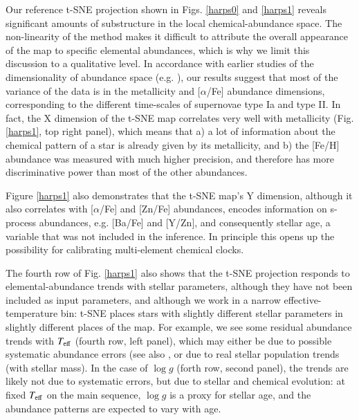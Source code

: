 \documentclass{aa}  %
\begin{document}
Our reference t-SNE projection shown in Figs. \ref{harps0} and \ref{harps1} reveals significant amounts of substructure in the local chemical-abundance space. The non-linearity of the method makes it difficult to attribute the overall appearance of the map to specific elemental abundances, which is why we limit this discussion to a qualitative level. In accordance with earlier studies of the dimensionality of abundance space (e.g. \citealt{Ting2012, Boesso2018}), our results suggest that most of the variance of the data is in the metallicity and [$\alpha$/Fe] abundance dimensions, corresponding to the different time-scales of supernovae type Ia and type II. In fact, the X dimension of the t-SNE map correlates very well with metallicity (Fig. \ref{harps1}, top right panel), which means that a) a lot of information about the chemical pattern of a star is already given by its metallicity, and b) the [Fe/H] abundance was measured with much higher precision, and therefore has more discriminative power than most of the other abundances. 

Figure \ref{harps1} also demonstrates that the t-SNE map's Y dimension, although it also correlates with [$\alpha$/Fe] and [Zn/Fe] abundances, encodes information on s-process abundances, e.g. [Ba/Fe] and [Y/Zn], and consequently stellar age, a variable that was not included in the inference. In principle this opens up the possibility for calibrating multi-element chemical clocks.%

The fourth row of Fig. \ref{harps1} also shows that the t-SNE projection responds to elemental-abundance trends with stellar parameters, although they have not been included as input parameters, and although we work in a narrow effective-temperature bin: t-SNE places stars with slightly different stellar parameters in slightly different places of the map. For example, we see some residual abundance trends with $T_{\rm eff}$ (fourth row, left panel), which may either be due to possible systematic abundance errors (see also \citealt{DelgadoMena2017}, or due to real stellar population trends (with stellar mass). In the case of $\log g$ (forth row, second panel), the trends are likely not due to systematic errors, but due to stellar and chemical evolution: at fixed $T_{\rm eff}$ on the main sequence, $\log g$ is a proxy for stellar age, and the abundance patterns are expected to vary with age.
\end{document}

